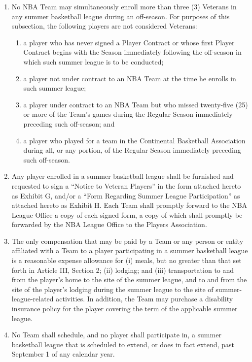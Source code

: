 \documentclass[
]{book}
\providecommand{\tightlist}{%
  \setlength{\itemsep}{0pt}\setlength{\parskip}{0pt}}
\begin{document}
\begin{enumerate}
\def\labelenumi{(\alph{enumi})}
\tightlist
\item
  No NBA Team may simultaneously enroll more than three (3) Veterans in any summer basketball league during an off-season. For purposes of this subsection, the following players are not considered Veterans:

  \begin{enumerate}
  \def\labelenumii{(\roman{enumii})}
  \tightlist
  \item
    a player who has never signed a Player Contract or whose first Player Contract begins with the Season immediately following the off-season in which such summer league is to be conducted;
  \item
    a player not under contract to an NBA Team at the time he enrolls in such summer league;
  \item
    a player under contract to an NBA Team but who missed twenty-five (25) or more of the Team's games during the Regular Season immediately preceding such off-season; and
  \item
    a player who played for a team in the Continental Basketball Association during all, or any portion, of the Regular Season immediately preceding such off-season.
  \end{enumerate}
\item
  Any player enrolled in a summer basketball league shall be furnished and requested to sign a ``Notice to Veteran Players'' in the form attached hereto as Exhibit G, and/or a ``Form Regarding Summer League Participation'' as attached hereto as Exhibit H. Each Team shall promptly forward to the NBA League Office a copy of each signed form, a copy of which shall promptly be forwarded by the NBA League Office to the Players Association.
\item
  The only compensation that may be paid by a Team or any person or entity affiliated with a Team to a player participating in a summer basketball league is a reasonable expense allowance for (i) meals, but no greater than that set forth in Article III, Section 2; (ii) lodging; and (iii) transportation to and from the player's home to the site of the summer league, and to and from the site of the player's lodging during the summer league to the site of summer-league-related activities. In addition, the Team may purchase a disability insurance policy for the player covering the term of the applicable summer league.
\item
  No Team shall schedule, and no player shall participate in, a summer basketball league that is scheduled to extend, or does in fact extend, past September 1 of any calendar year.
\end{enumerate}
\end{document}
